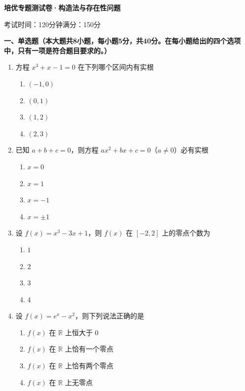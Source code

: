 \documentclass[12pt, a4paper]{ctexart}
\newcommand{\score}[1]{\hfill\makebox[2cm][l]{(#1分)}}
\begin{document}
\begin{center}
\Large\textbf{培优专题测试卷·构造法与存在性问题}

\normalsize
考试时间：120分钟\quad 满分：150分
\end{center}

\vspace{0.5cm}

\noindent\textbf{一、单选题（本大题共8小题，每小题5分，共40分。在每小题给出的四个选项中，只有一项是符合题目要求的。）}

\vspace{0.3cm}

\begin{enumerate}
\item 方程 $x^3 + x - 1 = 0$ 在下列哪个区间内有实根\score{5}
\begin{enumerate}[label=\Alph*.]
\item $(-1, 0)$
\item $(0, 1)$
\item $(1, 2)$
\item $(2, 3)$
\end{enumerate}

\item 已知 $a + b + c = 0$，则方程 $ax^2 + bx + c = 0$（$a \neq 0$）必有实根\score{5}
\begin{enumerate}[label=\Alph*.]
\item $x = 0$
\item $x = 1$
\item $x = -1$
\item $x = \pm 1$
\end{enumerate}

\item 设 $f(x) = x^3 - 3x + 1$，则 $f(x)$ 在 $[-2, 2]$ 上的零点个数为\score{5}
\begin{enumerate}[label=\Alph*.]
\item $1$
\item $2$
\item $3$
\item $4$
\end{enumerate}

\item 设 $f(x) = e^x - x^2$，则下列说法正确的是\score{5}
\begin{enumerate}[label=\Alph*.]
\item $f(x)$ 在 $\mathbb{R}$ 上恒大于 $0$
\item $f(x)$ 在 $\mathbb{R}$ 上恰有一个零点
\item $f(x)$ 在 $\mathbb{R}$ 上恰有两个零点
\item $f(x)$ 在 $\mathbb{R}$ 上无零点
\end{enumerate}


\end{enumerate}
\end{document}
